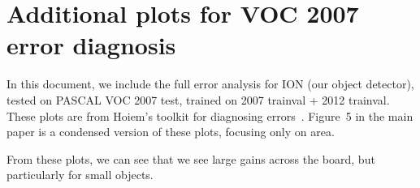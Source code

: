 \documentclass[10pt,twocolumn,letterpaper]{article}
\begin{document}
\section*{Additional plots for VOC 2007 error diagnosis}

In this document, we include the full error analysis for ION (our object
detector), tested on PASCAL VOC 2007 test, trained on 2007 trainval + 2012 trainval.
These plots are from Hoiem's toolkit for diagnosing errors~\cite{hoiem12error}.
Figure~{5} in the main paper is a condensed version of these plots, focusing
only on area.

From these plots, we can see that we see large gains across the board, but
particularly for small objects.

%

%

{\small


}

\end{document}
